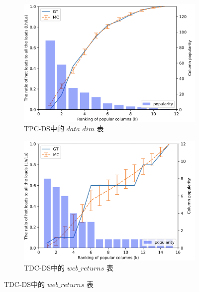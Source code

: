 \begin{figure}[]
    \centering
    \begin{subfigure}[t]{0.5\textwidth}
        \centering
        \includegraphics[width=1\textwidth]{img/cw-cache/ca_date_dim}
        \caption{TPC-DS中的 $data\_dim$ 表}
        \label{fig:ca-dd}
    \end{subfigure}%
    
    \begin{subfigure}[t]{0.5\textwidth}
        \centering
        \includegraphics[width=1\textwidth]{img/cw-cache/ca_web_returns}
        \caption{TDC-DS中的 $web\_returns$ 表}
        \label{fig:ca-wr}
    \end{subfigure}%
    

\end{figure}
